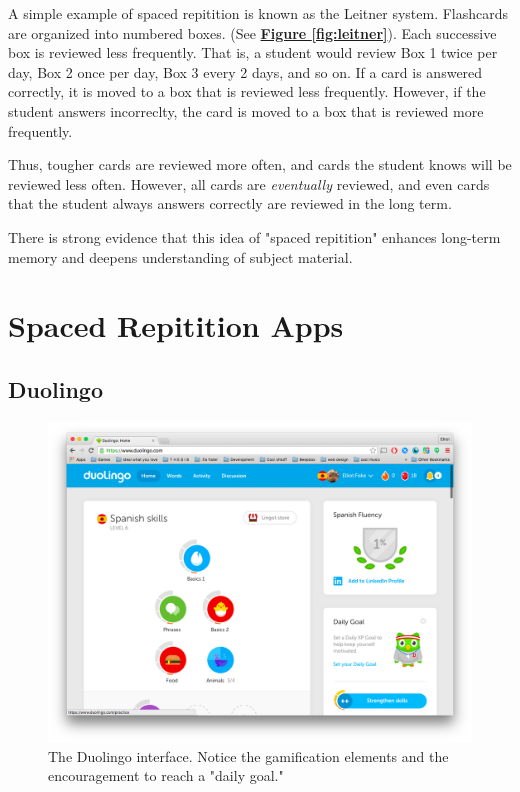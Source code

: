 \par A simple example of spaced repitition is known as the Leitner system. Flashcards are organized into numbered boxes. (See \textbf{\hyperref[fig:leitner]{Figure \ref*{fig:leitner}}}). Each successive box is reviewed less frequently. That is, a student would review Box 1 twice per day, Box 2 once per day, Box 3 every 2 days, and so on. If a card is answered correctly, it is moved to a box that is reviewed less frequently. However, if the student answers incorreclty, the card is moved to a box that is reviewed more frequently.

\par Thus, tougher cards are reviewed more often, and cards the student knows will be reviewed less often. However, all cards are \textit{eventually} reviewed, and even cards that the student always answers correctly are reviewed in the long term.

\par There is strong evidence that this idea of "spaced repitition" enhances long-term memory and deepens understanding of subject material. \cite{edge2012memreflex}


\section{Spaced Repitition Apps}
\subsection{Duolingo}

\begin{figure}
	\centerline{\includegraphics[width=1.2\linewidth]{duolingo}}
	\caption[Duolingo]{The Duolingo interface. Notice the gamification elements and the encouragement to reach a "daily goal."}
	\label{fig:duolingo}
\end{figure}

